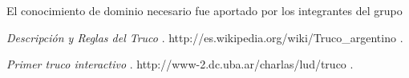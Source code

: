 \documentclass[12pt,a4paper]{article}
\begin{document}
El conocimiento de dominio necesario fue aportado por los integrantes del grupo 


\begin{thebibliography}{9}

	 \emph{Descripci\'on y Reglas del Truco }. 
	http://es.wikipedia.org/wiki/Truco\_argentino .

	 \emph{Primer truco interactivo }. 
	http://www-2.dc.uba.ar/charlas/lud/truco .


\end{thebibliography}
\end{document}
